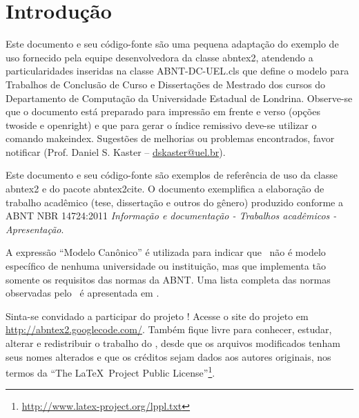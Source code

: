 \documentclass[
	12pt,				%
	openright,			%
	oneside,			%
	a4paper,			%
	dissertacao,			%
	]{ABNT-DC-UEL}
\begin{document}
\tableofcontents*
\cleardoublepage

\textual
\pagestyle{dc-uel-header} %

\chapter{Introdução}

Este documento e seu código-fonte são uma pequena adaptação do exemplo de uso fornecido pela equipe desenvolvedora da classe \textsf{abntex2}, atendendo a particularidades inseridas na classe \textsf{ABNT-DC-UEL.cls} que define o modelo para Trabalhos de Conclusão de Curso e Dissertações de Mestrado dos cursos do Departamento de Computação da Universidade Estadual de Londrina. Observe-se que o documento está preparado para impressão em frente e verso (opções twoside e openright) e que para gerar o índice remissivo deve-se utilizar o comando \textsf{makeindex}. Sugestões de melhorias ou problemas encontrados, favor notificar (Prof. Daniel S. Kaster -- \href{mailto:dskaster@uel.br}{dskaster@uel.br}).

Este documento e seu código-fonte são exemplos de referência de uso da classe \textsf{abntex2} e do pacote \textsf{abntex2cite}. O documento exemplifica a elaboração de trabalho acadêmico (tese, dissertação e outros do gênero) produzido conforme a ABNT NBR 14724:2011 \emph{Informação e documentação - Trabalhos acadêmicos - Apresentação}.

A expressão ``Modelo Canônico'' é utilizada para indicar que \abnTeX\ não é modelo específico de nenhuma universidade ou instituição, mas que implementa tão somente os requisitos das normas da ABNT. Uma lista completa das normas observadas pelo \abnTeX\ é apresentada em .

Sinta-se convidado a participar do projeto \abnTeX! Acesse o site do projeto em \url{http://abntex2.googlecode.com/}. Também fique livre para conhecer, estudar, alterar e redistribuir o trabalho do \abnTeX, desde que os arquivos modificados tenham seus nomes alterados e que os créditos sejam dados aos autores originais, nos termos da ``The \LaTeX\ Project Public License''\footnote{\url{http://www.latex-project.org/lppl.txt}}.
\end{document}
